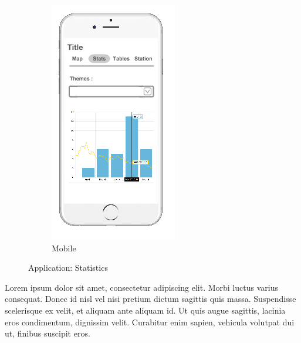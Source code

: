 \begin{figure}[ht]
\begin{subfigure}[b]{0.2\textwidth}
        \includegraphics[width=\textwidth]
          {img/c02-application/png/mobile-website-stats.png}
        \caption{Mobile}
    \end{subfigure}
    \caption{Application: Statistics}
\end{figure}

Lorem ipsum dolor sit amet, consectetur adipiscing elit. Morbi luctus varius consequat. Donec id nisl vel nisi pretium dictum sagittis quis massa. Suspendisse scelerisque ex velit, et aliquam ante aliquam id. Ut quis augue sagittis, lacinia eros condimentum, dignissim velit. Curabitur enim sapien, vehicula volutpat dui ut, finibus suscipit eros. 

